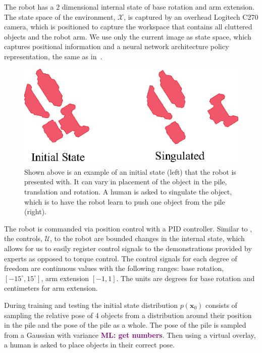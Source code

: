 \documentclass[10pt, conference]{ieeeconf}      %
\newcommand{\bx}{\mathbf{x}}
\newcommand{\mlnote}[1]{\ifthenelse{ \boolean{include-notes}}%
 {\textcolor{purple}{\textbf{ML: #1}}}{}}
\begin{document}
The robot has a 2 dimensional internal state of base rotation and arm extension. The state space of the environment, $\mathcal{X}$, is captured by  an overhead Logitech C270 camera, which is positioned to capture the workspace that contains all cluttered objects and the robot arm. We use only the current image as state space, which captures positional information and a neural network architecture policy representation, the same as in~\cite{laskeyrobot}.

\begin{figure}
\centering
\includegraphics{f_figs/singulation.eps}
\caption{
    \footnotesize
Shown above is an example of an initial state (left) that the robot is presented with. It can vary in placement of the object in the pile, translation and rotation. A human is asked to singulate the object, which is to have the robot learn to push one object from the pile (right).  }

\label{fig:izzy_rw}
\end{figure}

The robot is commanded via position 
control with a  PID controller. Similar to \cite{laskeyshiv}, the controls, $\mathcal{U}$, to the robot are bounded changes in the internal state, which allows for us to easily register control signals to the demonstrations provided by experts as opposed to torque control. The control signals for each degree of freedom are continuous values with the following ranges: base rotation, $[-15^\circ,15^\circ]$, arm extension $[-1,1]$. The units are degrees for base rotation and centimeters for arm extension. 

During training and testing the initial state distribution $p(\bx_0)$ consists of sampling the relative pose of 4 objects from a distribution around their position in the pile and the pose of the pile as a whole. The pose of the pile is sampled from a Gaussian with variance \mlnote{get numbers}. Then using a virtual overlay,  a human is asked to place objects in their correct pose. 
\end{document}
